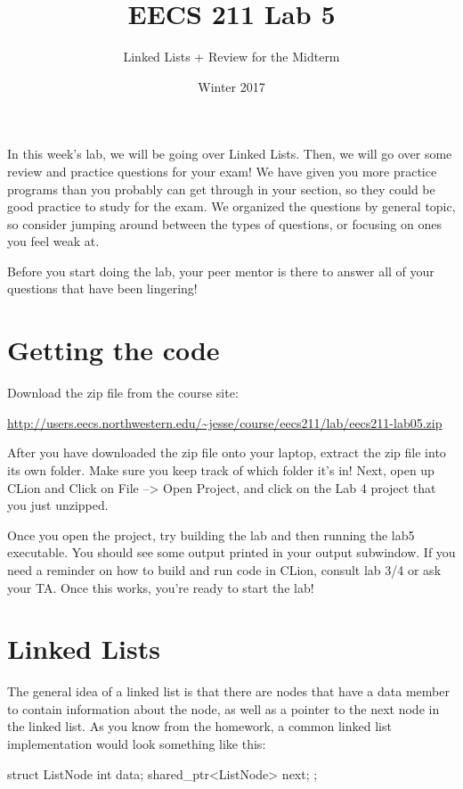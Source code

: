 \documentclass{tufte-handout}
\title{EECS 211 Lab 5}
\author{Linked Lists + Review for the Midterm}
\date{Winter 2017}
\begin{document}
\maketitle

In this week's lab, we will be going over Linked Lists. Then, we will go over some review and practice questions for your exam!  
We have given you more practice programs than you probably can get through in your section, so they could be good practice to study for the exam.
We organized the questions by general topic, so consider jumping around between the types of questions, or focusing on ones you feel weak at.

Before you start doing the lab, your peer mentor is there to answer all of your questions that have been lingering!
\section{Getting the code}
Download the zip file from the course site: \medskip

\url{http://users.eecs.northwestern.edu/~jesse/course/eecs211/lab/eecs211-lab05.zip}

\medskip \noindent
After you have downloaded the zip file onto your laptop, extract the zip file into its own folder. Make sure you keep track of which folder it's in!  Next, open up CLion and Click on File --> Open Project, and click on the Lab 4 project that you just unzipped. 

Once you open the project, try building the lab and then running the lab5 executable. 
You should see some output printed in your output subwindow.
If you need a reminder on how to build and run code in CLion, consult lab 3/4 or ask your TA.
Once this works, you're ready to start the lab!


\section{Linked Lists}
The general idea of a linked list is that there are nodes that have a data member to contain information about the node, as well as a pointer to the next node in the linked list.  
As you know from the homework, a common linked list implementation would look something like this:

\begin{Code}
struct ListNode{
    int data;
    shared_ptr<ListNode> next;
    };
\end{Code}
\end{document}
